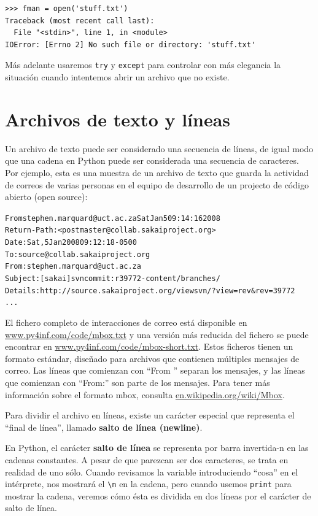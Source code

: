 \beforeverb
\begin{verbatim}
>>> fman = open('stuff.txt')
Traceback (most recent call last):
  File "<stdin>", line 1, in <module>
IOError: [Errno 2] No such file or directory: 'stuff.txt'
\end{verbatim}
\afterverb
%
Más adelante usaremos {\tt try} y {\tt except} para controlar con más
elegancia la situación cuando intentemos abrir un archivo
que no existe.

\section{Archivos de texto y líneas}

Un archivo de texto puede ser considerado una secuencia de líneas, de igual
modo que una cadena en Python puede ser considerada una secuencia de caracteres.
Por ejemplo, esta es una muestra de un archivo de texto que guarda la actividad de correos
de varias personas en el equipo de desarrollo de un projecto de código abierto (open source):

\beforeverb
\begin{alltt}
From stephen.marquard@uct.ac.za Sat Jan  5 09:14:16 2008
Return-Path: <postmaster@collab.sakaiproject.org>
Date: Sat, 5 Jan 2008 09:12:18 -0500
To: source@collab.sakaiproject.org
From: stephen.marquard@uct.ac.za
Subject: [sakai] svn commit: r39772 - content/branches/
Details: http://source.sakaiproject.org/viewsvn/?view=rev\&rev=39772
...
\end{alltt}
\afterverb

El fichero completo de interacciones de correo está disponible en
\url{www.py4inf.com/code/mbox.txt} 
y una versión más reducida del fichero se puede encontrar en
\url{www.py4inf.com/code/mbox-short.txt}.
Estos ficheros tienen un formato estándar, diseñado para archivos que contienen
múltiples mensajes de correo. Las líneas que comienzan con
``From '' separan los mensajes, y las líneas que comienzan con
``From:'' son parte de los mensajes.
Para tener más información sobre el formato mbox, consulta
\url{en.wikipedia.org/wiki/Mbox}. 

Para dividir el archivo en líneas, existe un carácter especial que
representa el ``final de línea'', llamado {\bf salto de línea (newline)}.

En Python, el carácter {\bf salto de línea} se representa por barra invertida-n en
las cadenas constantes. A pesar de que parezcan ser dos caracteres, se
trata en realidad de uno sólo. Cuando revisamos la variable introduciendo
``cosa'' en el intérprete, nos mostrará el \verb"\n" en la cadena,
pero cuando usemos {\tt print} para mostrar la cadena, veremos cómo ésta
es dividida en dos líneas por el carácter de salto de línea.

